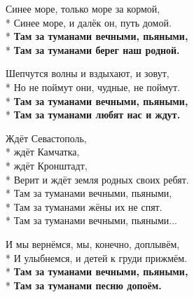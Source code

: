 \medskip

\begin{minipage}{\linewidth}
Синее море, только море за кормой,\\*
Синее море, и далёк он, путь домой.\\*
\textbf{Там за туманами вечными, пьяными,}\\*
\textbf{Там за туманами берег наш родной.}\\
\end{minipage}\par\medskip\nobreak

\medskip

\begin{minipage}{\linewidth}
Шепчутся волны и вздыхают, и зовут,\\*
Но не поймут они, чудные, не поймут.\\*
\textbf{Там за туманами вечными, пьяными,}\\*
\textbf{Там за туманами любят нас и ждут.}\\
\end{minipage}\par\medskip\nobreak

\medskip

\begin{minipage}{\linewidth}
Ждёт Севастополь,\\*
ждёт Камчатка,\\*
ждёт Кронштадт,\\*
Верит и ждёт земля родных своих ребят.\\*
Там за туманами вечными, пьяными,\\*
Там за туманами жёны их не спят.\\*
Там за туманами вечными, пьяными...\\
\end{minipage}\par\medskip\nobreak

\medskip

\begin{minipage}{\linewidth}
И мы вернёмся, мы, конечно, доплывём,\\*
И улыбнемся, и детей к груди прижмём.\\*
\textbf{Там за туманами вечными, пьяными,}\\*
\textbf{Там за туманами песню допоём.}\\
\end{minipage}

\vspace{\fill}\newpage

